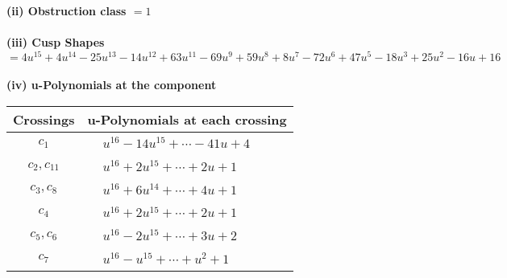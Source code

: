 \documentclass[1p]{elsarticle_modified}
\theoremstyle{definition}
\begin{document}
\flushleft \textbf{(ii) Obstruction class $= 1$}\\~\\
\flushleft \textbf{(iii) Cusp Shapes $= 4 u^{15}+4 u^{14}-25 u^{13}-14 u^{12}+63 u^{11}-69 u^9+59 u^8+8 u^7-72 u^6+47 u^5-18 u^3+25 u^2-16 u+16$}\\~\\
\newpage\renewcommand{\arraystretch}{1}
\flushleft \textbf{(iv) u-Polynomials at the component}\newline \\
\begin{tabular}{m{50pt}|m{274pt}}
Crossings & \hspace{64pt}u-Polynomials at each crossing \\
\hline $$\begin{aligned}c_{1}\end{aligned}$$&$\begin{aligned}
&u^{16}-14 u^{15}+\cdots-41 u+4
\end{aligned}$\\
\hline $$\begin{aligned}c_{2},c_{11}\end{aligned}$$&$\begin{aligned}
&u^{16}+2 u^{15}+\cdots+2 u+1
\end{aligned}$\\
\hline $$\begin{aligned}c_{3},c_{8}\end{aligned}$$&$\begin{aligned}
&u^{16}+6 u^{14}+\cdots+4 u+1
\end{aligned}$\\
\hline $$\begin{aligned}c_{4}\end{aligned}$$&$\begin{aligned}
&u^{16}+2 u^{15}+\cdots+2 u+1
\end{aligned}$\\
\hline $$\begin{aligned}c_{5},c_{6}\end{aligned}$$&$\begin{aligned}
&u^{16}-2 u^{15}+\cdots+3 u+2
\end{aligned}$\\
\hline $$\begin{aligned}c_{7}\end{aligned}$$&$\begin{aligned}
&u^{16}- u^{15}+\cdots+u^2+1
\end{aligned}$\\

\end{tabular}
\end{document}
